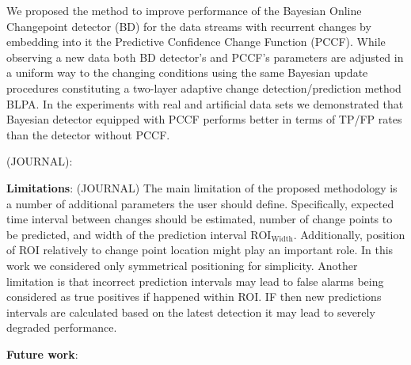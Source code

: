 We proposed the method to improve performance of the Bayesian Online Changepoint detector (BD) for the data streams with recurrent changes by embedding into it the Predictive Confidence Change Function (PCCF).
While observing a new data both BD detector's and PCCF's parameters are adjusted in a uniform way to the changing conditions using the same Bayesian update procedures constituting a two-layer adaptive change detection/prediction method BLPA.
In the experiments with real and artificial data sets we demonstrated that Bayesian detector equipped with PCCF performs better in terms of TP/FP rates than the detector without PCCF.

(JOURNAL): 

\textbf{Limitations}:
(JOURNAL)
The main limitation of the proposed methodology is a number of additional parameters the user should define.
Specifically, expected time interval between changes should be estimated, number of change points to be predicted, and width of the prediction interval $\text{ROI}_{\text{Width}}$.
Additionally, position of ROI relatively to change point location might play an important role. In this work we considered only symmetrical positioning for simplicity.
Another limitation is that incorrect prediction intervals may lead to false alarms being considered as true positives if happened within ROI. IF then new predictions intervals are calculated based on the latest detection it may lead to severely degraded performance. 

\textbf{Future work}:

